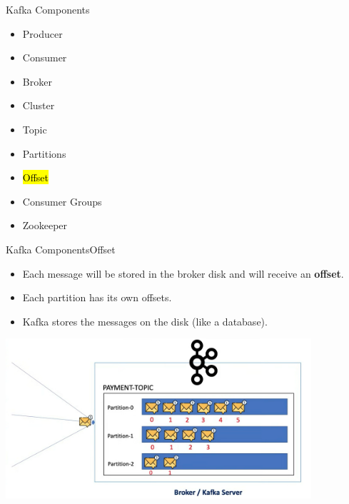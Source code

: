 \documentclass{beamer}
\begin{document}
\begin{frame}{Kafka Components}
  \begin{itemize}
    \item Producer
    \item Consumer
    \item Broker
    \item Cluster
    \item Topic
    \item Partitions
    \item \hl{Offset}
    \item Consumer Groups
    \item Zookeeper
  \end{itemize}
\end{frame}

\begin{frame}{Kafka Components}{Offset}
  \begin{itemize}
    \item Each message will be stored in the broker disk and will receive an \textbf{offset}.
    \item Each partition has its own offsets.
    \item Kafka stores the messages on the disk (like a database).
  \end{itemize}
  \hspace*{1em}
  \includegraphics[width=0.85\textwidth]{fig/offset.png}
\end{frame}
\end{document}
